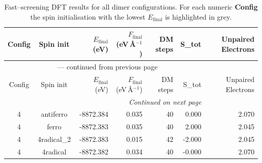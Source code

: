 
\begin{longtable}{@{}ccrrrrr@{}}
\caption{Fast–screening DFT results for all dimer configurations.
         For each numeric \textbf{Config} the spin initialisation with the
         lowest $E_{\mathrm{final}}$ is highlighted in grey.}\label{tab:dimer_full}\\
\toprule
Config & Spin init & $E_{\mathrm{final}}$ (eV) &
$F_{\mathrm{final}}$ (eV\,\AA$^{-1}$) & DM steps & S_{tot} & Unpaired Electrons\\
\midrule
\endfirsthead
\multicolumn{6}{c}{{\tablename}~\thetable{} — continued from previous page}\\
\toprule
Config & Spin init & $E_{\mathrm{final}}$ (eV) &
$F_{\mathrm{final}}$ (eV\,\AA$^{-1}$) & DM steps & S_{tot} & Unpaired Electrons\\
\midrule
\endhead
\midrule
\multicolumn{6}{r}{\emph{Continued on next page}}\\
\endfoot
\bottomrule
\endlastfoot
\rowcolor{gray!20} 4 & antiferro & -8872.384 & 0.035 & 40 & 0.000 & 2.070 \\
4 & ferro & -8872.383 & 0.035 & 40 & 2.000 & 2.045 \\
4 & 4radical\_2 & -8872.383 & 0.015 & 42 & -2.000 & 2.045 \\
4 & 4radical & -8872.382 & 0.034 & 40 & -0.000 & 2.070 \\
\end{longtable}